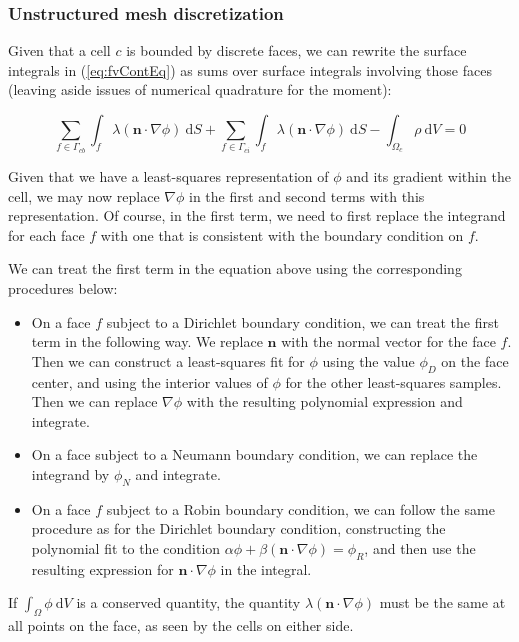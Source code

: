 \documentclass[12pt]{article}
\newcommand{\refEq}[1]{(\ref{eq:#1})}
\renewcommand{\vec}[1]{\mathbf{#1}}
\newcommand{\grad}[1]{\nabla#1}
\newcommand{\dV}{~\mathrm{d}V}
\newcommand{\dS}{~\mathrm{d}S}
\begin{document}
\subsubsection*{Unstructured mesh discretization}

Given that a cell $c$ is bounded by discrete faces, we can rewrite the surface integrals in \refEq{fvContEq} as sums over 
surface integrals involving those faces (leaving aside issues of numerical quadrature for the moment):

\begin{equation}
\sum_{f \in \Gamma_{cb}}\int_f \lambda (\vec{n}\cdot\grad{\phi}) \dS + 
\sum_{f \in \Gamma_{ci}}\int_f \lambda (\vec{n}\cdot\grad{\phi}) \dS - \int_{\Omega_c} \rho \dV = 0 
\end{equation}

\noindent
Given that we have a least-squares representation of $\phi$ and its gradient within the cell, we may now replace $\grad{\phi}$ 
in the first and second terms with this representation. Of course, in the first term, we need to first replace the 
integrand for each face $f$ with one that is consistent with the boundary condition on $f$.

We can treat the first term in the equation above using the corresponding procedures below:

\begin{itemize}
 \item On a face $f$ subject to a Dirichlet boundary condition, we can treat the first term in the following way. We replace $\vec{n}$ 
  with the normal vector for the face $f$. Then we can construct a least-squares fit for $\phi$ using the value $\phi_D$ on the face 
  center, and using the interior values of $\phi$ for the other least-squares samples. Then we can replace $\grad{\phi}$ with the 
  resulting polynomial expression and integrate.
 \item On a face subject to a Neumann boundary condition, we can replace the integrand by $\phi_N$ and integrate.
 \item On a face $f$ subject to a Robin boundary condition, we can follow the same procedure as for the Dirichlet boundary condition, 
  constructing the polynomial fit to the condition $\alpha\phi + \beta(\vec{n}\cdot\grad{\phi}) = \phi_R$, and then use the resulting 
  expression for $\vec{n}\cdot\grad{\phi}$ in the integral.
\end{itemize}

If $\int_\Omega \phi \dV$ is a conserved quantity, the quantity $\lambda(\vec{n}\cdot\grad{\phi})$ must be the same at all points
on the face, as seen by the cells on either side.
\end{document}
